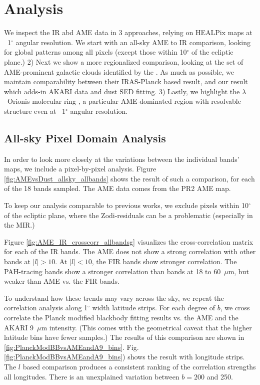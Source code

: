 \documentclass[preprint2,longabstract]{aastex}
\begin{document}
\section{Analysis}
\label{sec:analysis}

    We inspect the IR abd AME data in 3 approaches, relying on HEALPix maps at ~1$^{\circ}$ angular resolution. We start with an all-sky AME to IR comparison, looking for global patterns among all pixels (except those within 10$^{\circ}$ of the ecliptic plane.) 2) Next we show a more regionalized comparison, looking at the set of AME-prominent galactic clouds identified by the \cite{planckXV}. As much as possible, we maintain comparability between their IRAS-Planck based result, and our result which adds-in AKARI data and dust SED fitting. 3) Lastly, we highlight the $\lambda$~Orionis molecular ring \citep{maddalena86,maddalena87}, a particular AME-dominated region with resolvable structure even at ~1$^{\circ}$ angular resolution.

\subsection{All-sky Pixel Domain Analysis}

	In order to look more closely at the variations between the individual bands' maps, we include a pixel-by-pixel analysis. Figure \ref{fig:AMEvsDust_allsky_allbands} shows the result of such a comparison, for each of the 18 bands sampled. The AME data comes from the PR2 AME map.

    To keep our analysis comparable to previous works, we exclude pixels within 10$^{\circ}$ of the ecliptic plane, where the Zodi-residuals can be a problematic (especially in the MIR.)

     Figure \ref{fig:AME_IR_crosscorr_allbandsg} visualizes the cross-correlation matrix for each of the IR bands. The AME does not show a strong correlation with other bands at $|l|>10$. At $|l|<10$, the FIR bands show stronger correlation. The PAH-tracing bands show a stronger correlation than bands at 18 to 60~$\mu$m, but weaker than AME vs. the FIR bands.

  To understand how these trends may vary across the sky, we repeat the correlation analysis along 1$^{\circ}$ width latitude strips. For each degree of $b$, we cross correlate the Planck modified blackbody fitting results vs. the AME and the AKARI 9~$\mu$m intensity. (This comes with the geometrical caveat that the higher latitude bins have fewer samples.) The results of this comparison are shown in \ref{fig:PlanckModBBvsAMEandA9_bins}. Fig. \ref{fig:PlanckModBBvsAMEandA9_bins}) shows the result with longitude strips. The $l$ based comparison produces a consistent ranking of the correlation strengths all longitudes. There is an unexplained variation between $b = 200$ and 250.
\end{document}
